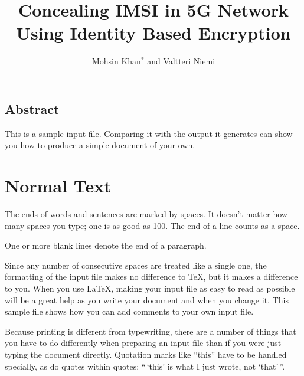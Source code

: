 \documentclass{river-journal}
\begin{document}
\begin{opening}
\title{Concealing IMSI in 5G Network Using Identity Based Encryption}
\author{Mohsin Khan$^{*}$ and Valtteri Niemi}
\end{opening}


\subsection*{Abstract}
This is a sample input file.  Comparing it with the output it
generates can show you how to produce a simple document of
your own.


\section{Normal Text}

The ends  of words and sentences are marked
  by   spaces. It  doesn't matter how many
spaces    you type; one is as good as 100.  The
end of   a line counts as a space.

One   or more   blank lines denote the  end
of  a paragraph.

Since any number of consecutive spaces are treated like a single
one, the formatting of the input file makes no difference to
      \TeX,         %
but it makes a difference to you.
When you use
      \LaTeX,       %
making your input file as easy to read as possible
will be a great help as you write your document and when you
change it.  This sample file shows how you can add comments to
your own input file.

Because printing is different from typewriting, there are a
number of things that you have to do differently when preparing
an input file than if you were just typing the document directly.
Quotation marks like
       ``this''
have to be handled specially, as do quotes within quotes:
       ``\,`this'                  %
    is what I just
    wrote, not  `that'\,''.
\end{document}

